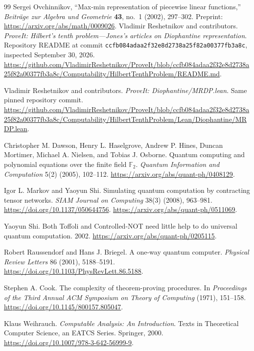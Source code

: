 \documentclass[11pt,letterpaper]{article}
\numberwithin{equation}{section}
\theoremstyle{definition}
\theoremstyle{remark}
\begin{document}
\begin{thebibliography}{99}
Sergei Ovchinnikov, ``Max-min representation of piecewise linear functions,''
\emph{Beitr\"age zur Algebra und Geometrie} \textbf{43}, no.~1 (2002), 297--302.
Preprint: \url{https://arxiv.org/abs/math/0009026}.
Vladimir Reshetnikov and contributors.
\emph{ProveIt: Hilbert's tenth problem---Jones's articles on Diophantine
representation}. Repository README at commit
\texttt{ccfb084adaa2f32e8d2738a25f82a00377fb3a8c}, inspected September 30, 2026.
\url{https://github.com/VladimirReshetnikov/ProveIt/blob/ccfb084adaa2f32e8d2738a25f82a00377fb3a8c/Computability/HilbertTenthProblem/README.md}.

Vladimir Reshetnikov and contributors.
\emph{ProveIt: Diophantine/MRDP.lean}. Same pinned repository commit.
\url{https://github.com/VladimirReshetnikov/ProveIt/blob/ccfb084adaa2f32e8d2738a25f82a00377fb3a8c/Computability/HilbertTenthProblem/Lean/Diophantine/MRDP.lean}.

Christopher M. Dawson, Henry L. Haselgrove, Andrew P. Hines, Duncan Mortimer,
Michael A. Nielsen, and Tobias J. Osborne.
Quantum computing and polynomial equations over the finite field $\mathbb F_2$.
\emph{Quantum Information and Computation} 5(2) (2005), 102--112.
\url{https://arxiv.org/abs/quant-ph/0408129}.

Igor L. Markov and Yaoyun Shi.
Simulating quantum computation by contracting tensor networks.
\emph{SIAM Journal on Computing} 38(3) (2008), 963--981.
\url{https://doi.org/10.1137/050644756}.
\url{https://arxiv.org/abs/quant-ph/0511069}.

Yaoyun Shi.
Both Toffoli and Controlled-NOT need little help to do universal quantum
computation. 2002.
\url{https://arxiv.org/abs/quant-ph/0205115}.

Robert Raussendorf and Hans J. Briegel.
A one-way quantum computer.
\emph{Physical Review Letters} 86 (2001), 5188--5191.
\url{https://doi.org/10.1103/PhysRevLett.86.5188}.

Stephen A. Cook.
The complexity of theorem-proving procedures.
In \emph{Proceedings of the Third Annual ACM Symposium on Theory of Computing}
(1971), 151--158.
\url{https://doi.org/10.1145/800157.805047}.

Klaus Weihrauch.
\emph{Computable Analysis: An Introduction}.
Texts in Theoretical Computer Science, an EATCS Series. Springer, 2000.
\url{https://doi.org/10.1007/978-3-642-56999-9}.


\end{thebibliography}
\end{document}
